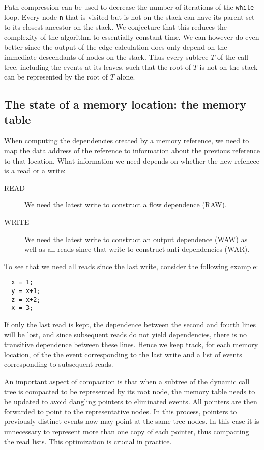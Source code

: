 \documentclass{acm_proc_article-sp}
\begin{document}
Path compression can be used to decrease the number of iterations of the 
{\tt while} loop.
Every node {\tt n} that is visited but is not on the stack can have its parent set 
to its closest ancestor on the stack. We conjecture that this reduces the 
complexity of the algorithm to essentially constant time. We can however do even 
better since the output of the edge calculation does only depend on the immediate
descendants of nodes on the stack. Thus every subtree $T$ of the call tree, 
including the events at its leaves, such
that the root of $T$ is not on the stack can be represented by the root of $T$
alone.

\subsection{The state of a memory location: the memory table}

When computing the dependencies created by a memory reference, we need to 
map the data address of the reference to information about the previous
reference to that location. What information we need depends on whether 
the new refenece is a read or a write:
\begin{description}
\item[READ]
We need the latest write to construct a flow dependence (RAW).
\item[WRITE]
We need the latest write to construct an output dependence (WAW) as well as
all reads since that write to construct anti dependencies (WAR).
\end{description}
To see that we need all reads since the last write, consider the following
example:
\begin{verbatim}
  x = 1;
  y = x+1;
  z = x+2;
  x = 3;
\end{verbatim}
If only the last read is kept, the dependence between the second and fourth
lines will be lost, and since subsequent reads do not yield dependencies, 
there is no transitive dependence between these lines.
Hence we keep track, for each memory location, of the the event corresponding 
to the last write and a list of events corresponding to subsequent reads.

An important aspect of compaction is that when a subtree of the dynamic
call tree is compacted to be represented by its root node, the memory table
needs to be updated to avoid dangling pointers to eliminated events. All
pointers are then forwarded to point to the representative nodes. In this
process, pointers to previously distinct events now may point at the same 
tree nodes. In this case it is unnecessary to represent more than one 
copy of each pointer, thus compacting the read lists. This optimization is 
crucial in practice.
\end{document}
